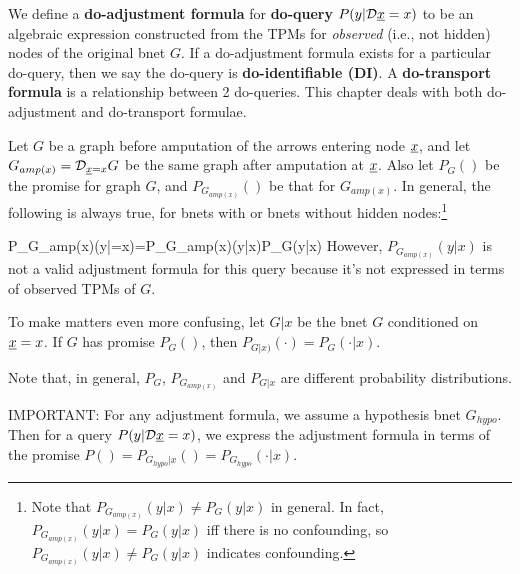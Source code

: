 We define a {\bf do-adjustment formula}
for {\bf do-query}
$P(y|\cald\rvx=x)$
to be an algebraic expression  
constructed from the TPMs for {\it observed} (i.e., not hidden) nodes of the original bnet $G$.
If a do-adjustment formula
exists for a
particular do-query,
then we say the do-query is
 {\bf do-identifiable (DI)}.
A {\bf do-transport formula}
is a relationship between 2  do-queries.
This chapter deals with both
do-adjustment and do-transport
formulae.

Let $G$ be a graph before
amputation
of the arrows entering node $\rvx$,
and let $G_{amp(x)}=\cald_{\rvx=x}G$
be the same graph after amputation
at $\rvx$.
Also let $P_G()$ be
the promise
for graph $G$, and $P_{G_{amp(x)}}()$
be that for $G_{amp(x)}$.
In general, the
following is always true,
for bnets
with or bnets without hidden nodes:\footnote{Note that $P_{G_{amp(x)}}(y|x)\neq P_G(y|x)$
in general.
In fact,
$P_{G_{amp(x)}}(y|x)= P_G(y|x)$
iff there is no confounding,
so $P_{G_{amp(x)}}(y|x)\neq P_G(y|x)$
indicates confounding.
}

\beq
P_{G_{amp(x)}}(y|\cald\rvx=x)=P_{G_{amp(x)}}(y|x)\neq P_G(y|x)
\;
\eeq
However, $P_{G_{amp(x)}}(y|x)$ is
not a valid adjustment formula
for this query
because it's not expressed in terms
of observed TPMs of $G$.

To make matters even more confusing, let $G|x$
be the bnet $G$ conditioned on $\rvx=x$. If $G$ has promise $P_G()$,
then  $P_{G|x)}(\cdot) = P_G(\cdot|x)$.
 
Note that, in general,  $P_G$, $P_{G_{amp(x)}}$ and $P_{G|x}$ are
different probability distributions. 

IMPORTANT: For any adjustment formula, we assume
a hypothesis bnet $G_{hypo}$.
Then for a query
$P(y|\cald\rvx=x)$, we express the adjustment
formula in terms of the promise $P()=P_{G_{hypo}|x}()=P_{G_{hypo}}(\cdot|x)$.




